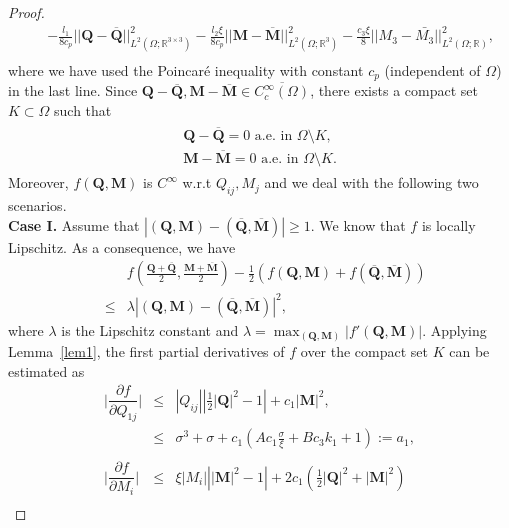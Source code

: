 \documentclass{article}
\def\Qvec{\mathbf{Q}}
\def \Mvec{\mathbf{M}}
\begin{document}
\begin{proof}
\begin{eqnarray}
& &- \frac{l_1}{8c_p}||\Qvec-\overline{\Qvec}||^2_{L^2\left(\Omega; \mathbb R^{3\times 3}\right)} -\frac{l_2\xi}{8c_p}||\Mvec-\overline{\Mvec}||^2_{L^2\left(\Omega; \mathbb R^3\right)} - \frac{c_3\xi}{8}||M_3-\bar{M_3}||^2_{L^2\left(\Omega; \mathbb R\right)},\nonumber\\ \label{eq:un1}
\end{eqnarray}
where we have used the Poincar\'e inequality 
with constant $c_p$ (independent of $\Omega$) in the last line. Since $\Qvec-\overline{\Qvec}, \Mvec-\overline{\Mvec}\in \overline{C^{\infty}_{c}\left(\Omega\right)}$, there exists a compact set $K\subset\Omega$ such that
\begin{eqnarray}
\begin{aligned}
\Qvec-\overline{\Qvec}=0 \mbox{ a.e. in } \Omega\setminus K,\label{eq:tay}\\
\Mvec-\overline{\Mvec}=0 \mbox{ a.e. in } \Omega\setminus K.
\end{aligned}
\end{eqnarray}
Moreover, $f\left(\Qvec, \Mvec\right)$ is $C^{\infty}$ w.r.t $Q_{ij}, M_j$ and we deal with the following two scenarios.\newline\\
\textbf{Case I.} Assume that $|\left(\Qvec, \Mvec\right)-\left(\overline{\Qvec}, \overline{\Mvec}\right)|\geq 1$. We know that $f$ is locally Lipschitz. As a consequence, we have
\begin{eqnarray}
& &f\left(\frac{\Qvec+\overline{\Qvec}}{2}, \frac{\Mvec+\overline{\Mvec}}{2}\right)-\frac{1}{2}\left(f\left(\Qvec, \Mvec\right) + f\left(\overline{\Qvec}, \overline{\Mvec}\right)\right)\nonumber\\
&\le&\lambda|\left(\Qvec, \Mvec\right)-\left(\overline{\Qvec}, \overline{\Mvec}\right)|^2,\label{eq:case1}
\end{eqnarray}
where $\lambda$ is the Lipschitz constant and $\lambda=\max_{\left(\Qvec, \Mvec\right)}|f'\left(\Qvec, \Mvec\right)|$. Applying Lemma~\ref{lem1}, the first partial derivatives of $f$ over the compact set $K$ can be estimated as 
\begin{eqnarray}
\Big|\dfrac{\partial f}{\partial Q_{1j}}\Big|&\le&|Q_{ij}|\left|\tfrac12|\Qvec|^2-1\right|+c_1|\Mvec|^2,\nonumber\\
&\le& \sigma^3 + \sigma + c_1\left(A c_1 \frac{\sigma}{\xi} + Bc_3k_1 + 1\right):=a_1,\nonumber\\
\label{eq:first_de1}\\
\Big|\dfrac{\partial f}{\partial M_{i}}\Big|&\le&\xi|M_i|\left||\Mvec|^2-1\right|+2c_1\left(\tfrac12|\Qvec|^2+|\Mvec|^2\right)\nonumber\\

\end{eqnarray}
\end{proof}
\end{document}
